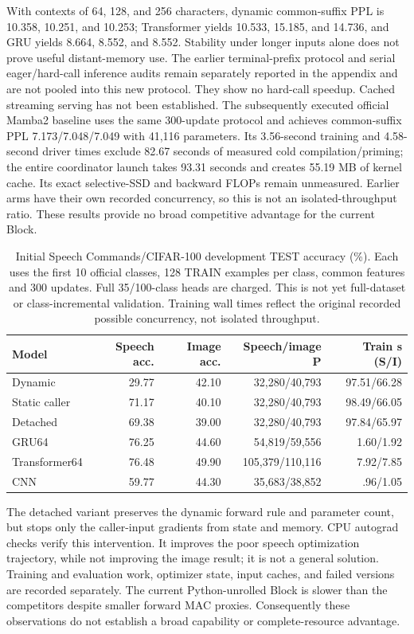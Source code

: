 With contexts of 64, 128, and 256 characters, dynamic common-suffix PPL is
10.358, 10.251, and 10.253; Transformer yields 10.533, 15.185, and 14.736,
and GRU yields 8.664, 8.552, and 8.552. Stability under longer
inputs alone does not prove useful distant-memory use. The earlier terminal-prefix
protocol and serial eager/hard-call inference audits remain separately reported
in the appendix and are not pooled into this new protocol. They show no
hard-call speedup. Cached streaming serving has not been established.
The subsequently executed official Mamba2 baseline uses the same 300-update
protocol and achieves common-suffix PPL 7.173/7.048/7.049 with 41,116 parameters.
Its 3.56-second training and 4.58-second driver times exclude 82.67 seconds of
measured cold compilation/priming; the entire coordinator launch takes 93.31
seconds and creates 55.19 MB of kernel cache. Its exact selective-SSD and
backward FLOPs remain unmeasured. Earlier arms have their own recorded
concurrency, so this is not an isolated-throughput ratio. These results
provide no broad competitive advantage for the current Block.

\begin{table}[t]
\centering\small
\begin{tabular}{lrrrr}
\toprule
Model &Speech acc.&Image acc.&Speech/image P&Train s (S/I)\\
\midrule
Dynamic &29.77&42.10&32,280/40,793&97.51/66.28\\
Static caller &71.17&40.10&32,280/40,793&98.49/66.05\\
Detached &69.38&39.00&32,280/40,793&97.84/65.97\\
GRU64 &76.25&44.60&54,819/59,556&1.60/1.92\\
Transformer64 &76.48&49.90&105,379/110,116&7.92/7.85\\
CNN &59.77&44.30&35,683/38,852&.96/1.05\\
\bottomrule
\end{tabular}
\caption{Initial Speech Commands/CIFAR-100 development TEST accuracy (\%).
Each uses the first 10 official classes, 128 TRAIN examples per class, common
features and 300 updates. Full 35/100-class heads are charged. This is not yet
full-dataset or class-incremental validation. Training wall times reflect the
original recorded possible concurrency, not isolated throughput.}
\label{tab:development-real}
\end{table}

The detached variant preserves the dynamic forward rule and parameter count,
but stops only the caller-input gradients from state and memory. CPU autograd
checks verify this intervention. It improves the poor speech optimization
trajectory, while not improving the image result; it is not a general solution.
Training and evaluation work, optimizer state, input caches, and failed
versions are recorded separately. The current Python-unrolled Block is slower
than the competitors despite smaller forward MAC proxies. Consequently these
observations do not establish a broad capability or complete-resource advantage.

